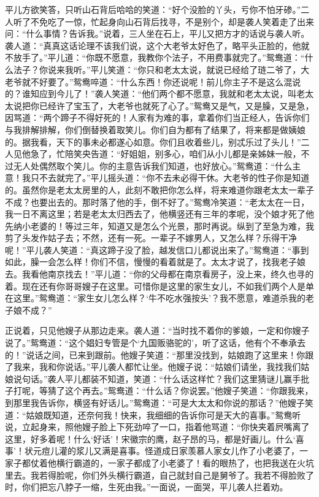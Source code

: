 平儿方欲笑答，只听山石背后哈哈的笑道：``好个没脸的丫头，亏你不怕牙碜。''二人听了不免吃了一惊，忙起身向山石背后找寻，不是别个，却是袭人笑着走了出来问：``什么事情？告诉我。''说着，三人坐在石上，平儿又把方才的话说与袭人听。袭人道：``真真这话论理不该我们说，这个大老爷太好色了，略平头正脸的，他就不放手了。''平儿道：``你既不愿意，我教你个法子，不用费事就完了。''鸳鸯道：``什么法子？你说来我听。''平儿笑道：``你只和老太太说，就说已经给了琏二爷了，大老爷就不好要了。''鸳鸯啐道：``什么东西！你还说呢！前儿你主子不是这么混说的？谁知应到今儿了！''袭人笑道：``他们两个都不愿意，我就和老太太说，叫老太太说把你已经许了宝玉了，大老爷也就死了心了。''鸳鸯又是气，又是臊，又是急，因骂道：``两个蹄子不得好死的！人家有为难的事，拿着你们当正经人，告诉你们与我排解排解，你们倒替换着取笑儿。你们自为都有了结果了，将来都是做姨娘的。据我看，天下的事未必都遂心如意。你们且收着些儿，别忒乐过了头儿！''二人见他急了，忙陪笑央告道：``好姐姐，别多心，咱们从小儿都是亲姊妹一般，不过无人处偶然取个笑儿。你的主意告诉我们知道，也好放心。''鸳鸯道：``什么主意！我只不去就完了。''平儿摇头道：``你不去未必得干休。大老爷的性子你是知道的。虽然你是老太太房里的人，此刻不敢把你怎么样，将来难道你跟老太太一辈子不成？也要出去的。那时落了他的手，倒不好了。''鸳鸯冷笑道：``老太太在一日，我一日不离这里；若是老太太归西去了，他横竖还有三年的孝呢，没个娘才死了他先纳小老婆的！等过三年，知道又是怎么个光景，那时再说。纵到了至急为难，我剪了头发作姑子去；不然，还有一死。一辈子不嫁男人，又怎么样？乐得干净呢！''平儿袭人笑道：``真这蹄子没了脸，越发信口儿都说出来了。''鸳鸯道：``事到如此，臊一会怎么样！你们不信，慢慢的看着就是了。太太才说了，找我老子娘去。我看他南京找去！''平儿道：``你的父母都在南京看房子，没上来，终久也寻的着。现在还有你哥哥嫂子在这里。可惜你是这里的家生女儿，不如我们两个人是单在这里。''鸳鸯道：``家生女儿怎么样？`牛不吃水强按头'？我不愿意，难道杀我的老子娘不成？''

正说着，只见他嫂子从那边走来。袭人道：``当时找不着你的爹娘，一定和你嫂子说了。''鸳鸯道：``这个娼妇专管是个`九国贩骆驼的'，听了这话，他有个不奉承去的！''说话之间，已来到跟前。他嫂子笑道：``那里没找到，姑娘跑了这里来！你跟了我来，我和你说话。''平儿袭人都忙让坐。他嫂子说：``姑娘们请坐，我找我们姑娘说句话。''袭人平儿都装不知道，笑道：``什么话这样忙？我们这里猜谜儿赢手批子打呢，等猜了这个再去。''鸳鸯道：``什么话？你说罢。''他嫂子笑道：``你跟我来，到那里我告诉你，横竖有好话儿。''鸳鸯道：``可是大太太和你说的那话？''他嫂子笑道：``姑娘既知道，还奈何我！快来，我细细的告诉你可是天大的喜事。''鸳鸯听说，立起身来，照他嫂子脸上下死劲啐了一口，指着他骂道：``你快夹着屄嘴离了这里，好多着呢！什么`好话'！宋徽宗的鹰，赵子昂的马，都是好画儿。什么`喜事'！状元痘儿灌的浆儿又满是喜事。怪道成日家羡慕人家女儿作了小老婆了，一家子都仗着他横行霸道的，一家子都成了小老婆了！看的眼热了，也把我送在火坑里去。我若得脸呢，你们外头横行霸道，自己就封自己是舅爷了。我若不得脸败了时，你们把忘八脖子一缩，生死由我。''一面说，一面哭，平儿袭人拦着劝。

